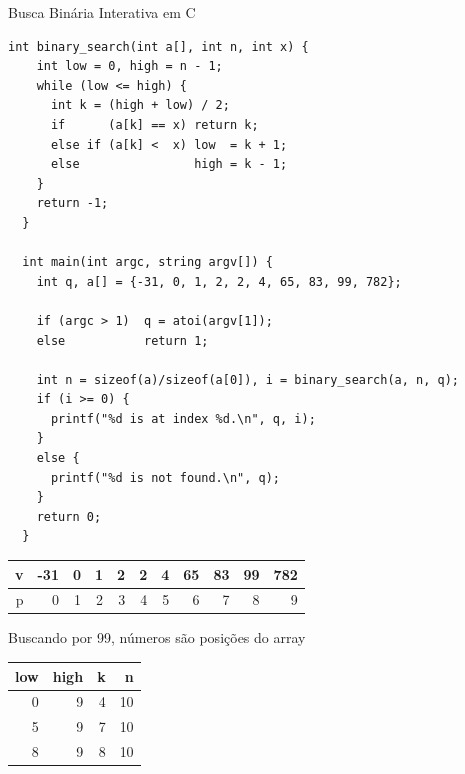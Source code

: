 \documentclass{beamer}
\begin{document}
\begin{frame}{Busca Binária Interativa em C}

  \begin{lstlisting}[style=tinyc,caption=numbers2.c]
  int binary_search(int a[], int n, int x) {
    int low = 0, high = n - 1;
    while (low <= high) {
      int k = (high + low) / 2;
      if      (a[k] == x) return k;
      else if (a[k] <  x) low  = k + 1;
      else                high = k - 1;
    }
    return -1;
  }

  int main(int argc, string argv[]) {
    int q, a[] = {-31, 0, 1, 2, 2, 4, 65, 83, 99, 782};
  
    if (argc > 1)  q = atoi(argv[1]);
    else           return 1;
    
    int n = sizeof(a)/sizeof(a[0]), i = binary_search(a, n, q);
    if (i >= 0) {
      printf("%d is at index %d.\n", q, i);
    }
    else {
      printf("%d is not found.\n", q);
    }
    return 0;
  }
  \end{lstlisting}

  \framebreak

  \begin{center}
    \begin{tabular}{|r|r|r|r|r|r|r|r|r|r|r|}
      \hline
      v & -31 & 0 & 1 & 2 & 2 & 4 & 65 & 83 & 99 & 782\\
      \hline
      p & 0 & 1 & 2 & 3 & 4 & 5 & 6 & 7 & 8 & 9\\
      \hline
    \end{tabular}
  \end{center}

  Buscando por 99, números são posições do array
  
  \begin{center}
    \begin{tabular}{rrrr}
      low & high & k & n\\ \hline
      0 & 9 & 4 & 10\\
      5 & 9 & 7 & 10\\
      8 & 9 & 8 & 10\\
    \end{tabular}
  \end{center}

\end{frame}
\end{document}
